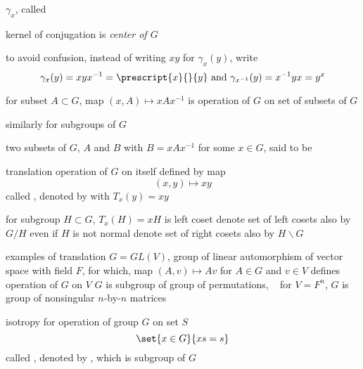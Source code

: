 \documentclass[17pt,landscape]{foils}
\begin{document}
{\bit
\item
	$\gamma_x$, called %

\item
	kernel of conjugation is \emph{center of $G$}

\item
	to avoid confusion, instead of writing $xy$ for $\gamma_x(y)$, write
	$$
		\gamma_x(y) = xyx^{-1} = \prescript{x}{}{y}
		\mbox{ and }
		\gamma_{x^{-1}}(y) = x^{-1}yx = {y}^x
	$$

\item
	for subset $A\subset G$,
	map $(x,A) \mapsto xAx^{-1}$
	is operation of $G$ on set of subsets of $G$

\item
	similarly for subgroups of $G$

\item
	two subsets of $G$, $A$ and $B$ with $B= x A x^{-1}$ for some $x\in G$,
	said to be %
\eit



\begin{mydefinition}{translation}%
	operation of $G$ on itself defined by map
	$$
		(x,y) \mapsto xy
	$$
	called ,
	denoted by 
	with $T_x(y) = xy$
\end{mydefinition}

\bit
\vitem
	for subgroup $H\subset G$,
	$T_x(H) = xH$ is left coset
	\bit
	\vitem
		denote set of left cosets also by $G/H$ even if $H$ is not normal
	\vitem
		denote set of right cosets also by $H\backslash G$
	\eit

\vitem examples of translation
	\ibit
	\vitem
		$G=GL(V)$, group of linear automorphism of vector space with field $F$,
		for which, map $(A,v)\mapsto Av$ for $A\in G$ and $v\in V$
		defines operation of $G$ on $V$
		\bit
		\iitem
			$G$ is subgroup of group of permutations, \
		\eit
	\vitem
		for $V=F^n$, $G$ is group of nonsingular $n$-by-$n$ matrices
	\eit
\eit
\vfill



\begin{mydefinition}{isotropy}%
	for operation of group $G$ on set $S$
	$$
		\set{x\in G}{xs = s}
	$$
	called ,
	denoted by ,
	which is subgroup of $G$\
\end{mydefinition}

}
\end{document}
